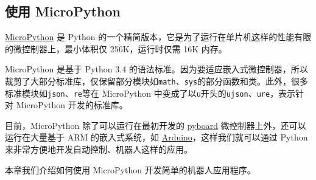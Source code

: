 \hypertarget{ux4f7fux7528-micropython}{%
\subsection{使用 MicroPython}\label{ux4f7fux7528-micropython}}

\href{https://micropython.org/}{MicroPython} 是 Python
的一个精简版本，它是为了运行在单片机这样的性能有限的微控制器上，最小体积仅
256K，运行时仅需 16K 内存。

MicroPython 是基于 Python 3.4
的语法标准。因为要适应嵌入式微控制器，所以裁剪了大部分标准库，仅保留部分模块如\texttt{math}、\texttt{sys}的部分函数和类。此外，很多标准模块如\texttt{json}、\texttt{re}等在
MicroPython
中变成了以\texttt{u}开头的\texttt{ujson}、\texttt{ure}，表示针对
MicroPython 开发的标准库。

目前，MicroPython 除了可以运行在最初开发的
\href{https://store.micropython.org/pyb-features}{pyboard}
微控制器上外，还可以运行在大量基于 ARM 的嵌入式系统，如
\href{https://www.arduino.cc/}{Arduino}，这样我们就可以通过 Python
来非常方便地开发自动控制、机器人这样的应用。

本章我们介绍如何使用 MicroPython 开发简单的机器人应用程序。

